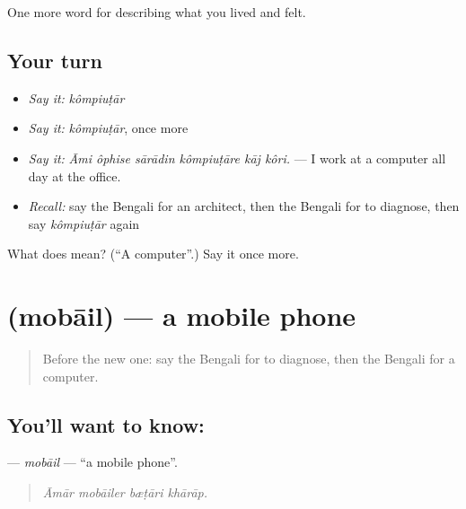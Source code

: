 \begin{grammarlens}[title={What you've built}]
One more word for describing what you lived and felt.
\end{grammarlens}

\subsection*{Your turn}
\begin{itemize}
\raggedright
  \item \emph{Say it:} \emph{kômpiuṭār}
  \item \emph{Say it:} \emph{kômpiuṭār}, once more
  \item \emph{Say it:} \emph{Āmi ôphise sārādin kômpiuṭāre kāj kôri.} — I work at a computer all day at the office.
  \item \emph{Recall:} say the Bengali for an architect, then the Bengali for to diagnose, then say \emph{kômpiuṭār} again
\end{itemize}

\begin{tcolorbox}[breakable,colback=teal!4,colframe=teal!35!black,title={Before you move on}]
What does  mean? (\textquotedblleft{}A computer\textquotedblright{}.) Say it once more.
\end{tcolorbox}
\section[\texorpdfstring{\bn{মোবাইল} (mobāil)}{মোবাইল (mobāil)}]{ (mobāil) — a mobile phone}

\label{lesson:BN-C502-mobail}



\begin{quote}
Before the new one: say the Bengali for to diagnose, then the Bengali for a computer.
\end{quote}

\subsection*{You'll want to know: }
\textbf{} — \emph{mobāil} — \textquotedblleft{}a mobile phone\textquotedblright{}.

\begin{quote}
   
\end{quote}

\begin{quote}
\emph{Āmār mobāiler bæṭāri khārāp.}
\end{quote}

